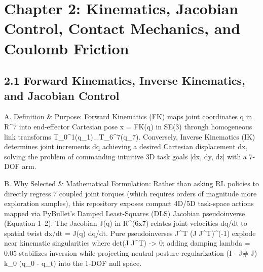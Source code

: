 \chapter{Chapter 2: Kinematics, Jacobian Control, Contact Mechanics, and Coulomb Friction}
\section{2.1 Forward Kinematics, Inverse Kinematics, and Jacobian Control}
A. Definition \& Purpose: Forward Kinematics (FK) maps joint coordinates q in R^7 into end-effector Cartesian pose x = FK(q) in SE(3) through homogeneous link transforms T\_0^1(q\_1)...T\_6^7(q\_7). Conversely, Inverse Kinematics (IK) determines joint increments dq achieving a desired Cartesian displacement dx, solving the problem of commanding intuitive 3D task goals [dx, dy, dz] with a 7-DOF arm.

B. Why Selected \& Mathematical Formulation: Rather than asking RL policies to directly regress 7 coupled joint torques (which requires orders of magnitude more exploration samples), this repository exposes compact 4D/5D task-space actions mapped via PyBullet's Damped Least-Squares (DLS) Jacobian pseudoinverse (Equation 1–2). The Jacobian J(q) in R^(6x7) relates joint velocities dq/dt to spatial twist dx/dt = J(q) dq/dt. Pure pseudoinverses J^T (J J^T)^(-1) explode near kinematic singularities where det(J J^T) -> 0; adding damping lambda = 0.05 stabilizes inversion while projecting neutral posture regularization (I - J\# J) k\_0 (q\_0 - q\_t) into the 1-DOF null space.

